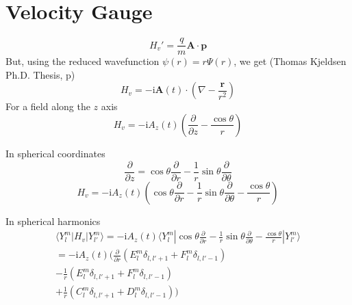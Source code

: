 \documentclass[a4paper,12pt]{paper}
\newcommand{\matelem}[3]{\langle #1 | #2 | #3 \rangle}
\renewcommand{\imath}{{\mathrm i}}
\newcommand{\partialdiff}[2]{\frac{\partial #1}{\partial #2}}
\renewcommand{\vec}[1]{\ensuremath{\textbf{#1}}}
\begin{document}
\section{Velocity Gauge}

\begin{equation}
 	H_v' = \frac{q}{m} \vec{A} \cdot \vec{p}
\end{equation}
But, using the reduced wavefunction $\psi(r) = r \Psi(r)$, we get (Thomas
Kjeldsen Ph.D. Thesis, p)
\begin{equation}
 	H_v = -\imath \vec{A}(t) \cdot (\nabla - \frac{\vec{r}}{r^2})
\end{equation}
For a field along the $z$ axis
\begin{equation}
 	H_v = -\imath A_z(t) \left( \partialdiff{}{z} - \frac{\cos \theta}{r}
\right)
\end{equation}

In spherical coordinates 
\begin{equation}
 	\partialdiff{}{z} = 
		\cos \theta \partialdiff{}{r} 
		- \frac{1}{r} \sin \theta \partialdiff{}{\theta}
\end{equation}
\begin{equation}
 	H_v = -\imath A_z(t) \left( 
		\cos \theta \partialdiff{}{r} 
		- \frac{1}{r} \sin \theta \partialdiff{}{\theta} 
		- \frac{\cos \theta}{r}
		\right)
\end{equation}

In spherical harmonics
\begin{eqnarray}
 	\matelem{Y_l^m}{H_v}{Y_{l'}^m} = -\imath A_z(t)
 	\matelem
	{Y_l^m}
	{ 
	\cos \theta \partialdiff{}{r} 
	- \frac{1}{r} \sin \theta \partialdiff{}{\theta} 
	- \frac{\cos \theta}{r}
	}
	{Y_{l'}^m}
	\\ = 
	-\imath A_z(t)
	(
	\partialdiff{}{r} (E_l^m \delta_{l,l'+1} + F_l^m \delta_{l,l'-1}) \\
	- \frac{1}{r} (E_l^m \delta_{l,l'+1} + F_l^m \delta_{l,l'-1}) \\
	+ \frac{1}{r} (C_l^m \delta_{l,l'+1} + D_l^m \delta_{l,l'-1})
	)
\end{eqnarray}
\end{document}
